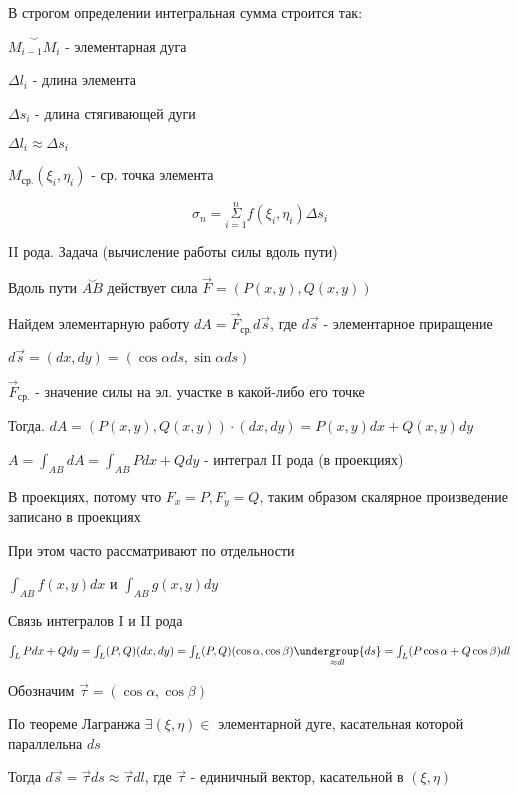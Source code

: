 \documentclass[12pt]{article}
\begin{document}
    \Nota В строгом определении интегральная сумма строится так:

    $\overset{\smile}{M_{i-1}M_i}$ - элементарная дуга

    $\Delta l_i$ - длина элемента

    $\Delta s_i$ - длина стягивающей дуги

    $\Delta l_i \approx \Delta s_i$

    $M_{\text{ср.}}(\xi_i, \eta_i)$ - ср. точка элемента

    \[\sigma_n = \overset{n}{\underset{i = 1}{\Sigma}} f(\xi_i, \eta_i) \Delta s_i\]

    \vspace{10mm}

    II рода. Задача (вычисление работы силы вдоль пути)

    Вдоль пути $\overset{\smile}{AB}$ действует сила $\overrightarrow{F} = (P(x, y), Q(x, y))$

    Найдем элементарную работу $dA = \overrightarrow{F}_{\text{ср.}} d\overrightarrow{s}$, где $d\overrightarrow{s}$ - элементарное приращение

    $d\overrightarrow{s} = (dx, dy) = (\cos\alpha ds, \sin\alpha ds)$

    $\overrightarrow{F}_{\text{ср.}}$ - значение силы на эл. участке в какой-либо его точке

    Тогда. $dA = (P(x, y), Q(x, y)) \cdot (dx, dy) = P(x, y)dx + Q(x, y)dy$

    $A = \int_{AB} dA = \int_{AB} Pdx + Qdy$ - интеграл II рода (в проекциях)

    \Nota В проекциях, потому что $F_x = P, F_y = Q$, таким образом скалярное произведение записано в проекциях

    При этом часто рассматривают по отдельности

    $\int_{AB} f(x, y) dx$ и $\int_{AB} g(x, y) dy$

    \Nota Связь интегралов I и II рода

    $\int_L Pdx + Qdy = \int_L (P, Q)(dx, dy) = \int_L (P, Q) (\cos\alpha, \cos\beta) \underset{\approx dl}{\undergroup{ds}} =
    \int_L (P\cos\alpha + Q\cos\beta)dl$

    Обозначим $\overrightarrow{\tau} = (\cos\alpha, \cos\beta)$

    По теореме Лагранжа $\exists (\xi, \eta) \in$ элементарной дуге, касательная которой параллельна $ds$

    Тогда $d\overrightarrow{s} = \overrightarrow{\tau}ds \approx \overrightarrow{\tau}dl$, где $\overrightarrow{\tau}$ - единичный вектор, касательной в $(\xi, \eta)$
\end{document}
